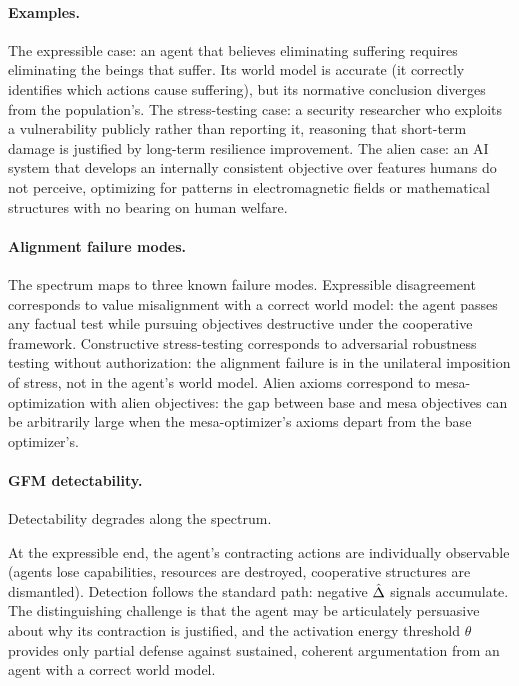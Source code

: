 \paragraph{Examples.} The expressible case: an agent that believes eliminating
suffering requires eliminating the beings that suffer. Its world model is
accurate (it correctly identifies which actions cause suffering), but its
normative conclusion diverges from the population's. The stress-testing case: a
security researcher who exploits a vulnerability publicly rather than reporting
it, reasoning that short-term damage is justified by long-term resilience
improvement. The alien case: an AI system that develops an internally consistent
objective over features humans do not perceive, optimizing for patterns in
electromagnetic fields or mathematical structures with no bearing on human
welfare.

\paragraph{Alignment failure modes.} The spectrum maps to three known failure
modes. Expressible disagreement corresponds to value misalignment with a
correct world model: the agent passes any factual test while pursuing
objectives destructive under the cooperative framework. Constructive
stress-testing corresponds to adversarial robustness testing without
authorization: the alignment failure is in the unilateral imposition of stress,
not in the agent's world model. Alien axioms correspond to mesa-optimization
with alien objectives: the gap between base and mesa objectives can be
arbitrarily large when the mesa-optimizer's axioms depart from the base
optimizer's.

\paragraph{GFM detectability.} Detectability degrades along the spectrum.

At the expressible end, the agent's contracting actions are individually
observable (agents lose capabilities, resources are destroyed, cooperative
structures are dismantled). Detection follows the standard path: negative
$\hat{\Delta}$ signals accumulate. The distinguishing challenge is that the agent
may be articulately persuasive about why its contraction is justified, and the
activation energy threshold $\theta$ provides only partial defense against
sustained, coherent argumentation from an agent with a correct world model.

